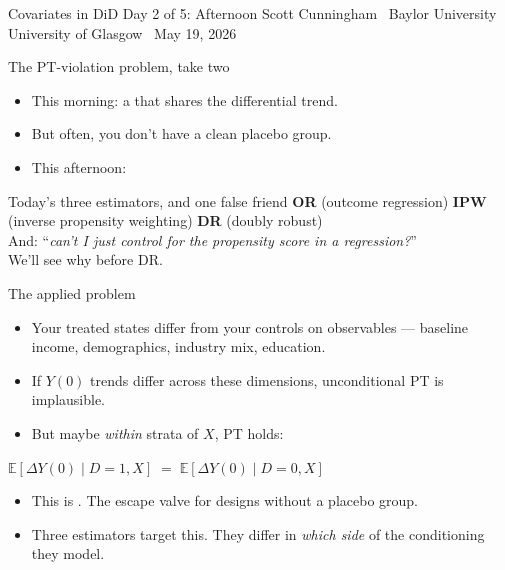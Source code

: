 \documentclass[aspectratio=169,11pt]{beamer}
\begin{document}

\remixtitleframe
  {Covariates in DiD}
  {Day 2 of 5: Afternoon}
  {Scott Cunningham \textperiodcentered\ Baylor University}
  {University of Glasgow \textperiodcentered\ May 19, 2026}

\begin{frame}{The PT-violation problem, take two}
\vspace{0.5em}
\begin{itemize}
  \item This morning: a  that shares the differential trend.
  \item But often, you don't have a clean placebo group.
  \item This afternoon: 
\end{itemize}
\vspace{0.6em}
\begin{block}{Today's three estimators, and one false friend}
\small
\textbf{OR} (outcome regression) \;\; \textbf{IPW} (inverse propensity weighting) \;\; \textbf{DR} (doubly robust) \\[0.3em]
And: ``\textit{can't I just control for the propensity score in a regression?}'' \\
 We'll see why before DR.
\end{block}
\end{frame}

\begin{frame}{The applied problem}
\vspace{0.5em}
\begin{itemize}
  \item Your treated states differ from your controls on observables --- baseline income, demographics, industry mix, education.
  \item If $Y(0)$ trends differ across these dimensions, unconditional PT is implausible.
  \item But maybe \textit{within} strata of $X$, PT holds:
\end{itemize}
\vspace{0.4em}
\begin{center}
\small
$\mathbb{E}[\Delta Y(0) \mid D=1, X] \;=\; \mathbb{E}[\Delta Y(0) \mid D=0, X]$
\end{center}
\vspace{0.5em}
\begin{itemize}
  \item This is . The escape valve for designs without a placebo group.
  \item Three estimators target this. They differ in \textit{which side} of the conditioning they model.
\end{itemize}
\end{frame}
\end{document}
